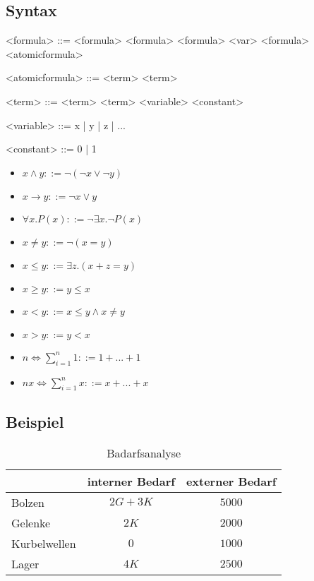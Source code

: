 \subsection{Syntax}
\begin{frame}[fragile]
  \begin{grammar}
    <formula> ::= \lit{$\neg$} <formula> \alt <formula> \lit{$\lor$} <formula> \alt \lit{$\exists$} <var> <formula> \alt <atomicformula>

    <atomicformula> ::= <term> \lit{$=$} <term>

    <term> ::= <term> \lit{$+$} <term> \alt <variable> \alt <constant>

    <variable> ::= x | y | z | ...

    <constant> ::= 0 | 1
  \end{grammar}
\end{frame}

\begin{frame}
  \begin{itemize}[<+->]
  	\item $x \land y ::= \neg (\neg x \lor \neg y)$
    \item $x \to y ::= \neg x \lor y$
    \item $\forall x . P(x) ::= \neg\exists x. \neg P(x)$
    \item $x \neq y ::= \neg (x = y)$
    \item $x \leq y ::= \exists z .(x + z = y)$
    \item $x \geq y ::= y \leq x$
    \item $x < y ::= x \leq y \land x \neq y$
    \item $x > y ::= y < x$
    \item $n \iff \sum_{i=1}^{n} 1 ::= 1 + ... + 1$
    \item $nx \iff \sum_{i=1}^{n} x ::= x + ... + x$
  \end{itemize}
\end{frame}

\subsection{Beispiel}
\begin{frame}
  \begin{table}
    \begin{tabular}{l | c | c }
    & interner Bedarf & externer Bedarf \\
    \hline \hline
    Bolzen & $2G+3K$ & $5000$ \\
    Gelenke & $2K$ & $2000$\\
    Kurbelwellen & $0$ & $1000$\\
    Lager & $4K$ & $2500$
    \end{tabular}
  \caption{Badarfsanalyse}
  \end{table}
\end{frame}

